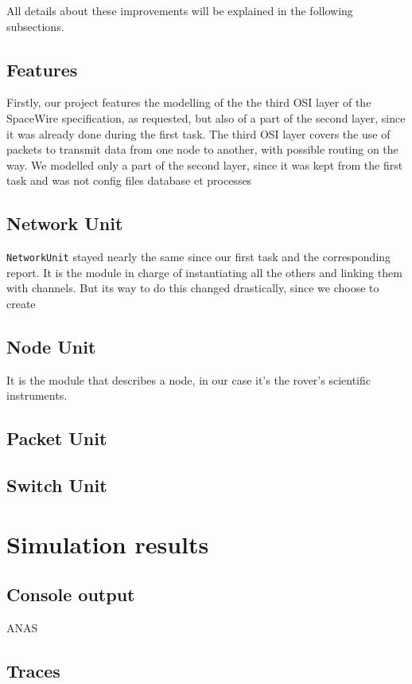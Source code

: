 \documentclass[12pt,a4paper]{article}
\begin{document}
All details about these improvements will be explained in the following subsections.

\subsection{Features}
Firstly, our project features the modelling of the the third OSI layer of the SpaceWire specification, as requested, but also of a part of the second layer, since it was already done during the first task.
The third OSI layer covers the use of packets to transmit data from one node to another, with possible routing on the way. We modelled only a part of the second layer, since it was kept from the first task and was not 
config files database et processes
\subsection{Network Unit}
\texttt{NetworkUnit} stayed nearly the same since our first task and the corresponding report. It is the module in charge of instantiating all the others and linking them with channels. But its way to do this changed drastically, since we choose to create
\subsection{Node Unit}

It is the module that describes a node, in our case it's the rover's scientific instruments. 

\subsection{Packet Unit}
\subsection{Switch Unit}


\pagebreak

\section{Simulation results}

\subsection{Console output}

ANAS

\subsection{Traces}
\end{document}
